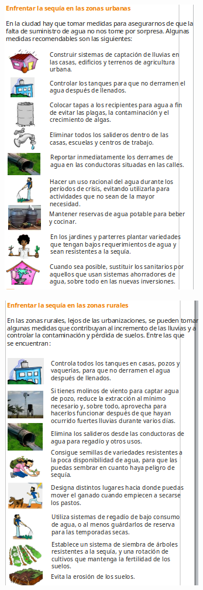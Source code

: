 \documentclass[12pt]{article}
\begin{document}
	\begin{figure}[H]
		\centering
		\includegraphics[width=0.8\linewidth]{./images/6}
	\end{figure}
	\begin{figure}[H]
		\centering
		\includegraphics[width=0.8\linewidth]{./images/7}
	\end{figure}
	
\end{document}
